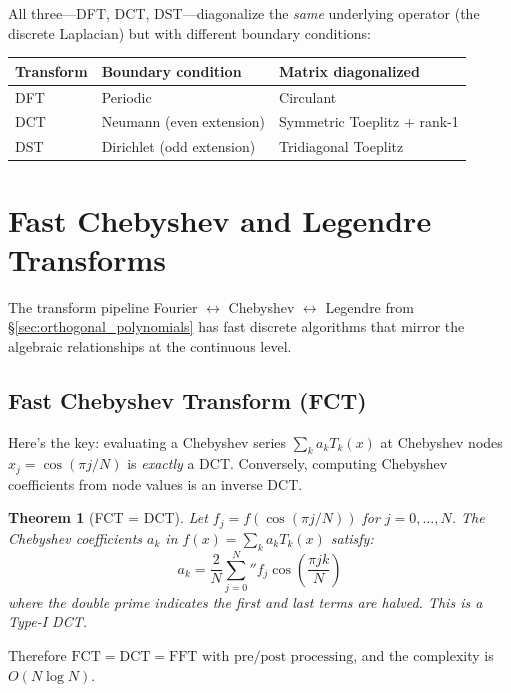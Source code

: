 \documentclass[12pt,a4paper]{report}
\theoremstyle{thms}
\newtheorem{theorem}{Theorem}[section]
\theoremstyle{defns}
\begin{document}
All three—DFT, DCT, DST—diagonalize the \textit{same} underlying operator (the discrete Laplacian) but with different boundary conditions:
\begin{center}
    \begin{tabular}{l l l}
        \hline
        \textbf{Transform} & \textbf{Boundary condition} & \textbf{Matrix diagonalized} \\
        \hline
        DFT & Periodic & Circulant \\
        DCT & Neumann (even extension) & Symmetric Toeplitz + rank-1 \\
        DST & Dirichlet (odd extension) & Tridiagonal Toeplitz \\
        \hline
    \end{tabular}
\end{center}

\section{Fast Chebyshev and Legendre Transforms}
\label{sec:fct_flt}

The transform pipeline Fourier $\leftrightarrow$ Chebyshev $\leftrightarrow$ Legendre from \S\ref{sec:orthogonal_polynomials} has fast discrete algorithms that mirror the algebraic relationships at the continuous level.

\subsection{Fast Chebyshev Transform (FCT)}

Here's the key: evaluating a Chebyshev series $\sum_{k} a_k T_k(x)$ at Chebyshev nodes $x_j = \cos(\pi j / N)$ is \textit{exactly} a DCT. Conversely, computing Chebyshev coefficients from node values is an inverse DCT.

\begin{theorem}[FCT = DCT]
    Let $f_j = f(\cos(\pi j/N))$ for $j = 0, \ldots, N$. The Chebyshev coefficients $a_k$ in $f(x) = \sum_k a_k T_k(x)$ satisfy:
    \begin{equation}
        a_k = \dfrac{2}{N}\sum_{j=0}^{N} {}'' f_j \cos\left(\dfrac{\pi jk}{N}\right)
    \end{equation}
    where the double prime indicates the first and last terms are halved. This is a Type-I DCT.
\end{theorem}

Therefore $\text{FCT} = \text{DCT} = \text{FFT with pre/post processing}$, and the complexity is $O(N \log N)$.
\end{document}
